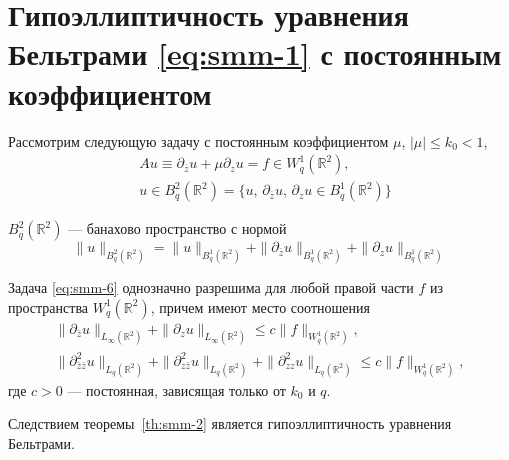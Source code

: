 \section{Гипоэллиптичность уравнения Бельтрами \texorpdfstring{\eqref{eq:smm-1}}{} с постоянным коэффициентом}
Рассмотрим следующую задачу с постоянным коэффициентом  $\mu$, $|\mu|\leqslant k_0<1$,
\begin{equation}\label{eq:smm-6}
\begin{split}
	&Au\equiv\partial_{\bar{z}}u+\mu\partial_z u=f\in W^1_q (\mathbb{R}^2),\\
	&u\in B_q^2(\mathbb{R}^2) =\{u,\,\partial_{\bar{z}}u,\,\partial_z u\in 
	B_q^1(\mathbb{R}^2)\}
\end{split} 
\end{equation}

$B_q^2(\mathbb{R}^2)$ --- банахово пространство с нормой
$$
\|u\|_{B_q^2(\mathbb{R}^2)}=\|u\|_{B_q^1(\mathbb{R}^2)}+\|\partial_{\bar{z}}u\|_{B_q^1(\mathbb{R}^2)}+\|\partial_{z}u\|_{B_q^1(\mathbb{R}^2)}
$$

\begin{theorem}\label{th:smm-2}
	Задача \eqref{eq:smm-6} однозначно разрешима для любой правой части $f$ из пространства $W_q^1 (\mathbb{R}^2)$, причем имеют место соотношения
	\begin{gather*}
		\|\partial_{\bar{z}}u\|_{L_\infty(\mathbb{R}^2)}+\|\partial_{z}u\|_{L_\infty(\mathbb{R}^2)}
		\leqslant c\|f\|_{W^1_q (\mathbb{R}^2)}, %
		\\
		\|\partial^2_{\bar{z}\bar{z}}u\|_{L_q(\mathbb{R}^2)}+\|\partial^2_{z\bar{z}}u\|_{L_q(\mathbb{R}^2)}+\|\partial^2_{zz}u\|_{L_q(\mathbb{R}^2)}
		\leqslant c\|f\|_{W^1_q (\mathbb{R}^2)}, %
	\end{gather*}
	где $c >0$ --- постоянная, зависящая только от $k_0$ и $q$.
\end{theorem}

Следствием теоремы~\ref{th:smm-2} является гипоэллиптичность уравнения Бельтрами.

